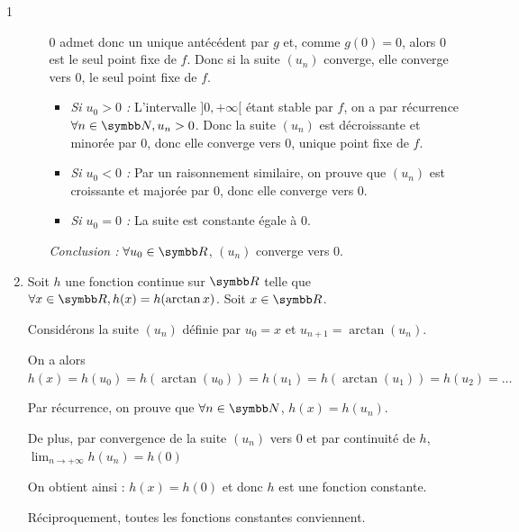 \begin{correction}{1}
\begin{enumerate}
\begin{enumerate}
        $0$ admet donc un unique antécédent par $g$ et, comme $g(0)=0$, alors 0 est le seul point fixe de $f$.
        Donc si la suite $(u_{n})$ converge, elle converge vers 0, le seul point fixe de $f$.
        \begin{itemize}
            \item \textit{Si $u_{0}>0$ :} L'intervalle $]0,+\infty[$ étant stable par $f$, on a par récurrence $\forall n\in\N, u_{n}>0$. 
                Donc la suite $(u_{n})$ est décroissante et minorée par 0, donc elle converge vers 0, unique point fixe de $f$.
            \item \textit{Si $u_{0}<0$ :} Par un raisonnement similaire, on prouve que $(u_{n})$ est croissante et majorée par 0, donc elle converge vers 0.
            \item \textit{Si $u_{0}=0$ :} La suite est constante égale à 0.
        \end{itemize}

        \textit{Conclusion :} $\forall u_{0}\in\R$, $(u_{n})$ converge vers 0.
    \end{enumerate}

    \item 
    Soit $h$ une fonction continue sur $\R$ telle que $\forall x\in\R, h(x)=h(\arctan x)$.
    Soit $x\in\R$. 

    Considérons la suite $(u_{n})$ définie par $u_{0}=x$ et $u_{n+1}=\arctan(u_{n})$.

    On a alors $h(x)=h(u_{0})=h(\arctan(u_{0}))=h(u_{1})=h(\arctan(u_{1}))=h(u_{2})=\dots$

    Par récurrence, on prouve que $\forall n\in\N$, $h(x)=h(u_{n})$.

    De plus, par convergence de la suite $(u_{n})$ vers 0 et par continuité de $h$, $\lim_{n\rightarrow+\infty}h(u_{n})=h(0)$ 

    On obtient ainsi : $h(x)=h(0)$ et donc $h$ est une fonction constante.

    Réciproquement, toutes les fonctions constantes conviennent.
\end{enumerate}
\end{correction}

